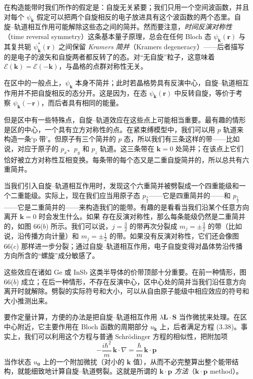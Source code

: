 在构造能带时我们所作的假定是：自旋无关紧要；我们只用一个空间波函数，并且对每个 $\psi_{\mathbf{k}}$ 假定可以把两个自旋相反的电子放进具有这个波函数的两个态里。自旋–轨道相互作用可能解除这些态之间的简并。然而要注意，\emph{时间反演对称性}（time reversal symmetry）这条基本量子原理，总会在任何 Bloch 态 $\psi_{\mathbf{k}}(\mathbf{r})$ 与其复共轭 $\psi_{\mathbf{k}}^*(\mathbf{r})$ 之间保留 \emph{Kramers 简并}（Kramers degeneracy）——后者描写的是电子的波矢和自旋两者都反转了的态。对“无自旋”粒子，这意味着 $\mathcal{E}(\mathbf{k})=\mathcal{E}(-\mathbf{k})$，与晶格的点群对称性无关。

在区中的一般点上，$\psi_{\mathbf{k}}$ 本身不简并；此时若晶格势具有反演中心，自旋–轨道相互作用并不把自旋相反的态分开。这是因为，在态 $\psi_{\mathbf{k}}(\mathbf{r})$ 中反转自旋，等价于考察 $\psi_{\mathbf{k}}(-\mathbf{r})$，而后者具有相同的能量。

但是区中有一些特殊点，自旋–轨道效应在这些点上可能相当重要。最有趣的情形是区的中心，一个具有立方对称性的点。在紧束缚模型中，我们可以用 $p$ 轨道来构造一条‘p 带’。但原子有三个简并的 $p$ 态，所以我们有三条这样的带——比如说，对应于原子的 $p_x$、$p_y$ 和 $p_z$ 轨道。这三条带在 $\mathbf{k}=0$ 处简并；在该点上它们恰好被立方对称性互相变换。每条带的每个态又是二重自旋简并的，所以总共有六重简并。

当我们引入自旋–轨道相互作用时，发现这个六重简并被劈裂成一个四重能级和一个二重能级。实际上，现在我们应当用原子态 $p_{\frac{3}{2}}$——它是四重简并的——和 $p_{\frac{1}{2}}$——它是二重简并的——来构造我们的能带。有趣的是看看当我们沿某个任意方向离开 $\mathbf{k}=0$ 时会发生什么。如果
存在反演对称性，那么每条能级仍然是二重简并的，如图 66($b$) 所示。我们可以说，$j=\frac{3}{2}$ 的带再次分裂成 $m_j=\pm\frac{3}{2}$ 的带（比如说，沿传播方向计量）和 $m_j=\pm\frac{1}{2}$ 的带。如果没有反演对称性，它们还会像图 66($c$) 那样进一步分裂；通过自旋–轨道相互作用，电子自旋变得对晶体势沿传播方向所含的“螺旋”成分敏感了。


这些效应在诸如 Ge 或 InSb 这类半导体的价带顶部十分重要。在前一种情形，图 66($b$) 成立；在后一种情形，不存在反演中心，区中心处的简并当我们沿任意方向离开时就解除。劈裂的实际符号和大小，可以从自由原子能级中相应效应的符号和大小推测出来。

要作定量计算，方便的办法是把自旋–轨道相互作用 $\lambda\mathbf{L}\cdot\mathbf{S}$ 当作微扰来处理。在区中心附近，它主要作用在 Bloch 函数的周期部分 $u_{\mathbf{k}}$ 上，后者满足方程 (3.38)。事实上，我们可以利用这个方程与普通 Schrödinger 方程的相似性，把附加项
\begin{equation*}
-\frac{i\hbar^2}{m}\,\mathbf{k}\cdot\nabla=\frac{\hbar}{m}\,\mathbf{k}\cdot\mathbf{p}\tag{3.83}
\end{equation*}
当作状态 $u_{\mathbf{0}}$ 上的一个附加微扰（对小的 $\mathbf{k}$ 值），从而不必完整算出整个能带结构，就能细致地计算自旋–轨道劈裂。这就是所谓的 \emph{$\mathbf{k}\cdot\mathbf{p}$ 方法}（$\mathbf{k}\cdot\mathbf{p}$ method）。
